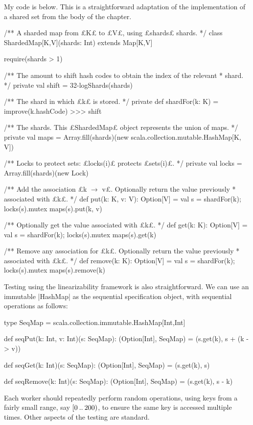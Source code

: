 \begin{answerS}
My code is below.  This is a straightforward adaptation of the
implementation of a shared set from the body of the chapter. 

 
\begin{scala}
/** A sharded map from £K£ to £V£, using £shards£ shards. */
class ShardedMap[K,V](shards: Int) extends Map[K,V]{
  require(shards > 1)

  /** The amount to shift hash codes to obtain the index of the relevant
    * shard. */
  private val shift = 32-logShards(shards)

  /** The shard in which £k£ is stored. */ 
  private def shardFor(k: K) = improve(k.hashCode) >>> shift

  /** The shards.  This £ShardedMap£ object represents the union of maps. */ 
  private val maps = 
    Array.fill(shards)(new scala.collection.mutable.HashMap[K, V])

  /** Locks to protect sets: £locks(i)£ protects £sets(i)£. */
  private val locks = Array.fill(shards)(new Lock)

  /** Add the association £k $\rightarrow$ v£.  Optionally return the value previously
    * associated with £k£. */
  def put(k: K, v: V): Option[V] = {
    val s = shardFor(k); locks(s).mutex{ maps(s).put(k, v) }
  }

  /** Optionally get the value associated with £k£. */
  def get(k: K): Option[V] = {
    val s = shardFor(k); locks(s).mutex{ maps(s).get(k) }
  }

  /** Remove any association for £k£.  Optionally return the value previously
    * associated with £k£. */
  def remove(k: K): Option[V] = {
    val s = shardFor(k); locks(s).mutex{ maps(s).remove(k) }
  }
}
\end{scala}

Testing using the linearizability framework is also straightforward.  We can
use an immutable |HashMap| as the sequential specification object, with
sequential operations as follows:
%
\begin{scala}
  type SeqMap = scala.collection.immutable.HashMap[Int,Int]

  def seqPut(k: Int, v: Int)(s: SeqMap): (Option[Int], SeqMap) = 
    (s.get(k), s + (k -> v))

  def seqGet(k: Int)(s: SeqMap): (Option[Int], SeqMap) = 
    (s.get(k), s)

  def seqRemove(k: Int)(s: SeqMap): (Option[Int], SeqMap) = 
    (s.get(k), s - k)
\end{scala}

Each worker should repeatedly perform random operations, using keys from a
fairly small range, say $[0 \mathbin{..} 200)$, to ensure the same key is
accessed multiple times.  Other aspects of the testing are standard.
\end{answerS}
